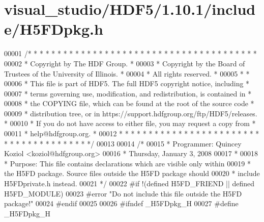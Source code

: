 \hypertarget{visual__studio_2_h_d_f5_21_810_81_2include_2_h5_f_dpkg_8h_source}{}\section{visual\+\_\+studio/\+H\+D\+F5/1.10.1/include/\+H5\+F\+Dpkg.h}
\label{visual__studio_2_h_d_f5_21_810_81_2include_2_h5_f_dpkg_8h_source}

\begin{DoxyCode}
00001 \textcolor{comment}{/* * * * * * * * * * * * * * * * * * * * * * * * * * * * * * * * * * * * * * *}
00002 \textcolor{comment}{ * Copyright by The HDF Group.                                               *}
00003 \textcolor{comment}{ * Copyright by the Board of Trustees of the University of Illinois.         *}
00004 \textcolor{comment}{ * All rights reserved.                                                      *}
00005 \textcolor{comment}{ *                                                                           *}
00006 \textcolor{comment}{ * This file is part of HDF5.  The full HDF5 copyright notice, including     *}
00007 \textcolor{comment}{ * terms governing use, modification, and redistribution, is contained in    *}
00008 \textcolor{comment}{ * the COPYING file, which can be found at the root of the source code       *}
00009 \textcolor{comment}{ * distribution tree, or in https://support.hdfgroup.org/ftp/HDF5/releases.  *}
00010 \textcolor{comment}{ * If you do not have access to either file, you may request a copy from     *}
00011 \textcolor{comment}{ * help@hdfgroup.org.                                                        *}
00012 \textcolor{comment}{ * * * * * * * * * * * * * * * * * * * * * * * * * * * * * * * * * * * * * * */}
00013 
00014 \textcolor{comment}{/*}
00015 \textcolor{comment}{ * Programmer:  Quincey Koziol <koziol@hdfgroup.org>}
00016 \textcolor{comment}{ *      Thursday, January  3, 2008}
00017 \textcolor{comment}{ *}
00018 \textcolor{comment}{ * Purpose: This file contains declarations which are visible only within}
00019 \textcolor{comment}{ *      the H5FD package.  Source files outside the H5FD package should}
00020 \textcolor{comment}{ *      include H5FDprivate.h instead.}
00021 \textcolor{comment}{ */}
00022 \textcolor{preprocessor}{#if !(defined H5FD\_FRIEND || defined H5FD\_MODULE)}
00023 \textcolor{preprocessor}{#error "Do not include this file outside the H5FD package!"}
00024 \textcolor{preprocessor}{#endif}
00025 
00026 \textcolor{preprocessor}{#ifndef \_H5FDpkg\_H}
00027 \textcolor{preprocessor}{#define \_H5FDpkg\_H}

\end{DoxyCode}
